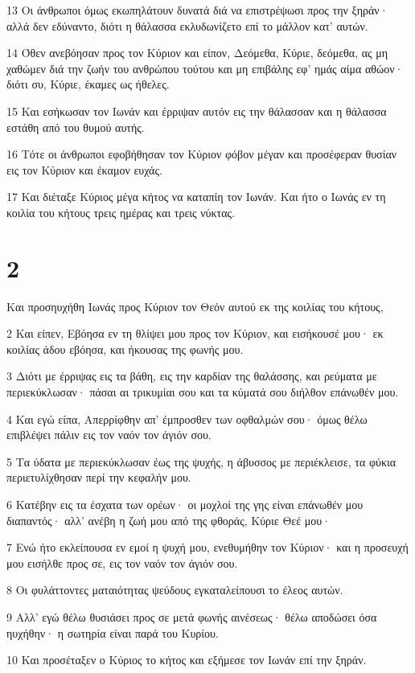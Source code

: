 \par 13 Οι άνθρωποι όμως εκωπηλάτουν δυνατά διά να επιστρέψωσι προς την ξηράν· αλλά δεν εδύναντο, διότι η θάλασσα εκλυδωνίζετο επί το μάλλον κατ' αυτών.
\par 14 Όθεν ανεβόησαν προς τον Κύριον και είπον, Δεόμεθα, Κύριε, δεόμεθα, ας μη χαθώμεν διά την ζωήν του ανθρώπου τούτου και μη επιβάλης εφ' ημάς αίμα αθώον· διότι συ, Κύριε, έκαμες ως ήθελες.
\par 15 Και εσήκωσαν τον Ιωνάν και έρριψαν αυτόν εις την θάλασσαν και η θάλασσα εστάθη από του θυμού αυτής.
\par 16 Τότε οι άνθρωποι εφοβήθησαν τον Κύριον φόβον μέγαν και προσέφεραν θυσίαν εις τον Κύριον και έκαμον ευχάς.
\par 17 Και διέταξε Κύριος μέγα κήτος να καταπίη τον Ιωνάν. Και ήτο ο Ιωνάς εν τη κοιλία του κήτους τρεις ημέρας και τρεις νύκτας.

\chapter{2}

\par Και προσηυχήθη Ιωνάς προς Κύριον τον Θεόν αυτού εκ της κοιλίας του κήτους,
\par 2 Και είπεν, Εβόησα εν τη θλίψει μου προς τον Κύριον, και εισήκουσέ μου· εκ κοιλίας άδου εβόησα, και ήκουσας της φωνής μου.
\par 3 Διότι με έρριψας εις τα βάθη, εις την καρδίαν της θαλάσσης, και ρεύματα με περιεκύκλωσαν· πάσαι αι τρικυμίαι σου και τα κύματά σου διήλθον επάνωθέν μου.
\par 4 Και εγώ είπα, Απερρίφθην απ' έμπροσθεν των οφθαλμών σου· όμως θέλω επιβλέψει πάλιν εις τον ναόν τον άγιόν σου.
\par 5 Τα ύδατα με περιεκύκλωσαν έως της ψυχής, η άβυσσος με περιέκλεισε, τα φύκια περιετυλίχθησαν περί την κεφαλήν μου.
\par 6 Κατέβην εις τα έσχατα των ορέων· οι μοχλοί της γης είναι επάνωθέν μου διαπαντός· αλλ' ανέβη η ζωή μου από της φθοράς, Κύριε Θεέ μου·
\par 7 Ενώ ήτο εκλείπουσα εν εμοί η ψυχή μου, ενεθυμήθην τον Κύριον· και η προσευχή μου εισήλθε προς σε, εις τον ναόν τον άγιόν σου.
\par 8 Οι φυλάττοντες ματαιότητας ψεύδους εγκαταλείπουσι το έλεος αυτών.
\par 9 Αλλ' εγώ θέλω θυσιάσει προς σε μετά φωνής αινέσεως· θέλω αποδώσει όσα ηυχήθην· η σωτηρία είναι παρά του Κυρίου.
\par 10 Και προσέταξεν ο Κύριος το κήτος και εξήμεσε τον Ιωνάν επί την ξηράν.

